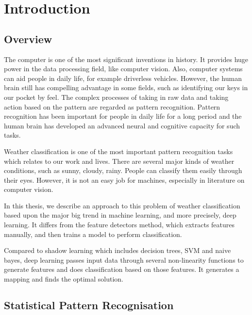 \chapter{Introduction} %
\label{Chapter1}


\section{Overview}

The computer is one of the most significant inventions in history. It provides huge power in the data processing field, like computer vision. Also, computer systems can aid people in daily life, for example driverless vehicles. However, the human brain still has compelling advantage in some fields, such as identifying our keys in our pocket by feel. The complex processes of taking in raw data and taking action based on the pattern are regarded as pattern recognition. Pattern recognition has been important for people in daily life for a long period and the human brain has developed an advanced neural and cognitive capacity for such tasks.

Weather classification is one of the most important pattern recognition tasks which relates to our work and lives. There are several major kinds of weather conditions, such as sunny, cloudy, rainy. People can classify them easily through their eyes. However, it is not an easy job for machines, especially in literature on computer vision. 

In this thesis, we describe an approach to this problem of weather classification based upon the major big trend in machine learning, and more precisely, deep learning. It differs from the feature detectors method, which extracts features manually, and then trains a model to perform classification.

Compared to shadow learning which includes decision trees, SVM and naive bayes, deep learning passes input data through several non-linearity functions to generate features and does classification based on those features. It generates a mapping and finds the optimal solution.

\section{Statistical Pattern Recognisation}

